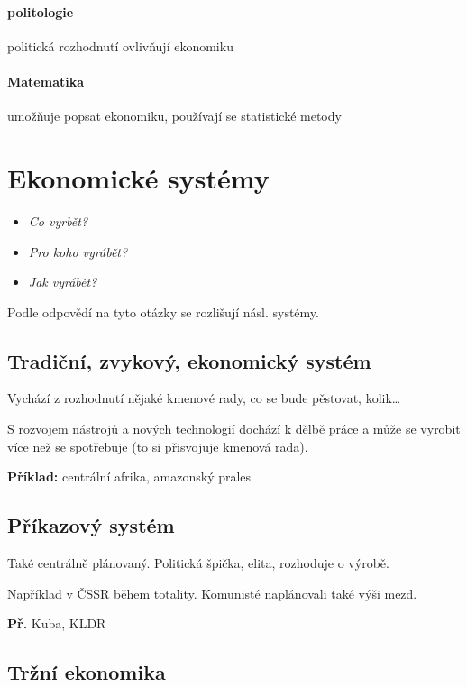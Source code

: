 \documentclass[10pt,a4paper,
twoside,%
]{report}
\begin{document}
\paragraph{politologie} politická rozhodnutí ovlivňují ekonomiku

\paragraph{Matematika} umožňuje popsat ekonomiku, používají se statistické metody

\section{Ekonomické systémy}

\begin{itemize}
\item\emph{Co vyrbět?}
\item\emph{Pro koho vyrábět?}
\item\emph{Jak vyrábět?}
\end{itemize}

Podle odpovědí na tyto otázky se rozlišují násl. systémy.

\subsection{Tradiční, zvykový, ekonomický systém}

Vychází z rozhodnutí nějaké kmenové rady, co se bude pěstovat, kolik\dots

S rozvojem nástrojů a nových technologií dochází k dělbě práce a může se vyrobit více než se spotřebuje (to si přisvojuje kmenová rada).

\textbf{Příklad:} centrální afrika, amazonský prales

\subsection{Příkazový systém}

Také centrálně plánovaný. Politická špička, elita, rozhoduje o výrobě.

Například v ČSSR během totality. Komunisté naplánovali také výši mezd.

\textbf{Př.} Kuba, KLDR

\subsection{Tržní ekonomika}
\end{document}
